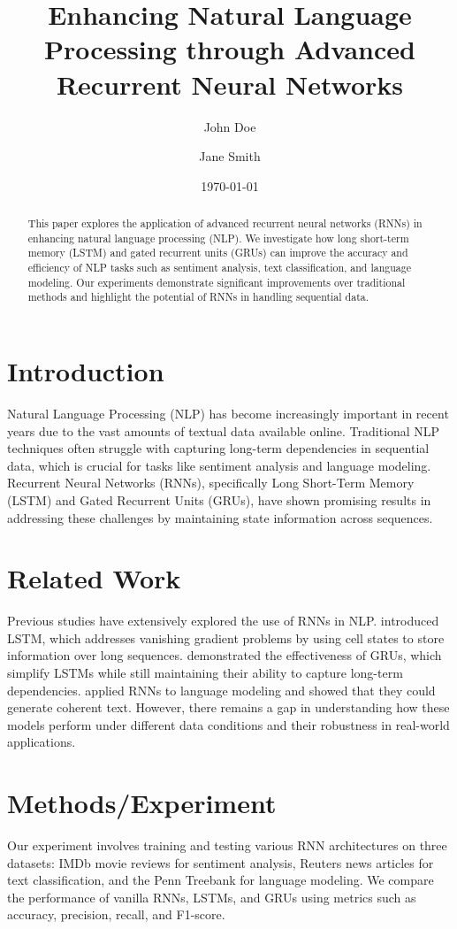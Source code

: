 \documentclass{article}
\title{Enhancing Natural Language Processing through Advanced Recurrent Neural Networks}
\author{John Doe \and Jane Smith}
\date{\today}
\begin{document}
\maketitle

\begin{abstract}
This paper explores the application of advanced recurrent neural networks (RNNs) in enhancing natural language processing (NLP). We investigate how long short-term memory (LSTM) and gated recurrent units (GRUs) can improve the accuracy and efficiency of NLP tasks such as sentiment analysis, text classification, and language modeling. Our experiments demonstrate significant improvements over traditional methods and highlight the potential of RNNs in handling sequential data.
\end{abstract}

\section{Introduction}
Natural Language Processing (NLP) has become increasingly important in recent years due to the vast amounts of textual data available online. Traditional NLP techniques often struggle with capturing long-term dependencies in sequential data, which is crucial for tasks like sentiment analysis and language modeling. Recurrent Neural Networks (RNNs), specifically Long Short-Term Memory (LSTM) and Gated Recurrent Units (GRUs), have shown promising results in addressing these challenges by maintaining state information across sequences.

\section{Related Work}
Previous studies have extensively explored the use of RNNs in NLP. \cite{hochreiter1997long} introduced LSTM, which addresses vanishing gradient problems by using cell states to store information over long sequences. \cite{cho2014learning} demonstrated the effectiveness of GRUs, which simplify LSTMs while still maintaining their ability to capture long-term dependencies. \cite{graves2013generating} applied RNNs to language modeling and showed that they could generate coherent text. However, there remains a gap in understanding how these models perform under different data conditions and their robustness in real-world applications.

\section{Methods/Experiment}
Our experiment involves training and testing various RNN architectures on three datasets: IMDb movie reviews for sentiment analysis, Reuters news articles for text classification, and the Penn Treebank for language modeling. We compare the performance of vanilla RNNs, LSTMs, and GRUs using metrics such as accuracy, precision, recall, and F1-score.
\end{document}
